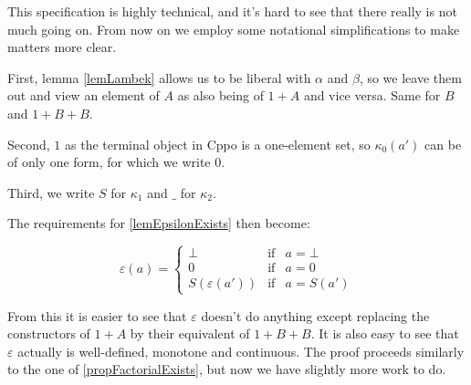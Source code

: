 \documentclass[a4paper]{article}
\begin{document}
This specification is highly technical, and it's hard to see that there really
is not much going on.  From now on we employ some notational simplifications to
make matters more clear.

First, lemma \ref{lemLambek} allows us to be liberal with $\alpha$ and $\beta$,
so we leave them out and view an element of $A$ as also being of $1 + A$ and
vice versa. Same for $B$ and $1+B+B$.

Second, $1$ as the terminal object in Cppo is a one-element set, so
$\kappa_0(a')$ can be of only one form, for which we write $0$.

Third, we write $S$ for $\kappa_1$ and $\_$ for $\kappa_2$.

The requirements for \ref{lemEpsilonExists} then become:

\begin{equation*}
\varepsilon(a) = \left\{
  \begin{array}{rcl}
   \bot & \text{if} & a = \bot \\
   0 & \text{if} & a = 0 \\
   S(\varepsilon(a')) & \text{if} & a = S(a')
  \end{array}
\right.
\end{equation*}

From this it is easier to see that $\varepsilon$ doesn't do anything except
replacing the constructors of $1+A$ by their equivalent of $1+B+B$. It is
also easy to see that $\varepsilon$ actually is well-defined, monotone and
continuous. The proof proceeds similarly to the one of
\ref{propFactorialExists}, but now we have slightly more work to do.
\end{document}
